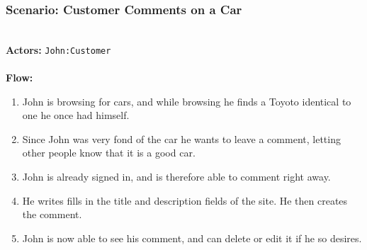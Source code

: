 \subsubsection{Scenario: Customer Comments on a Car}
\label{sec:scenario-createcomment}
\HRule \\[0.4cm]
\textbf{Actors:} \texttt{John:Customer}\\
\HRule \\[0.4cm]
\textbf{Flow:} \\
\begin{enumerate}
\item John is browsing for cars, and while browsing he finds a Toyoto identical to one he once had himself.
\item Since John was very fond of the car he wants to leave a comment, letting other people know that it is a good car.
\item John is already signed in, and is therefore able to comment right away.
\item He writes fills in the title and description fields of the site. He then creates the comment.
\item John is now able to see his comment, and can delete or edit it if he so desires.
\end{enumerate}
\HRule \\[0.4cm]
